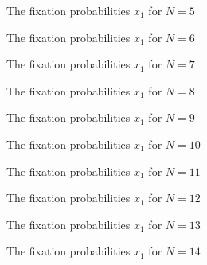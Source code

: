 \documentclass[10pt,letterpaper]{article}
\begin{document}
\begin{figure}[!hbtp]
    \centering
    \caption{The fixation probabilities \(x_1\) for \(N=5\)}
\end{figure}

\begin{figure}[!hbtp]
    \centering
    \caption{The fixation probabilities \(x_1\) for \(N=6\)}
\end{figure}

\begin{figure}[!hbtp]
    \centering
    \caption{The fixation probabilities \(x_1\) for \(N=7\)}
\end{figure}

\begin{figure}[!hbtp]
    \centering
    \caption{The fixation probabilities \(x_1\) for \(N=8\)}
\end{figure}

\begin{figure}[!hbtp]
    \centering
    \caption{The fixation probabilities \(x_1\) for \(N=9\)}
\end{figure}

\begin{figure}[!hbtp]
    \centering
    \caption{The fixation probabilities \(x_1\) for \(N=10\)}
\end{figure}

\begin{figure}[!hbtp]
    \centering
    \caption{The fixation probabilities \(x_1\) for \(N=11\)}
\end{figure}

\begin{figure}[!hbtp]
    \centering
    \caption{The fixation probabilities \(x_1\) for \(N=12\)}
\end{figure}

\begin{figure}[!hbtp]
    \centering
    \caption{The fixation probabilities \(x_1\) for \(N=13\)}
\end{figure}

\begin{figure}[!hbtp]
    \centering
    \caption{The fixation probabilities \(x_1\) for \(N=14\)}
    \label{invasion-14}
\end{figure}
\end{document}
